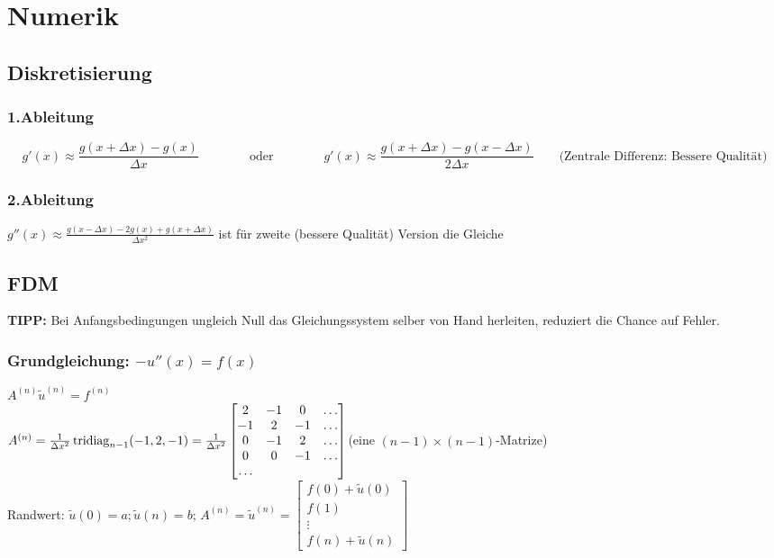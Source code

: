 
\section{Numerik}
\subsection{Diskretisierung}
\subsubsection{1.Ableitung}

$$g'(x)\approx \frac{g(x+\Delta x)-g(x)}{\Delta x} \qquad\qquad \text{oder}
\qquad\qquad \boxed{g'(x)\approx \frac{g(x+\Delta x)-g(x-\Delta x)}{2\Delta
x}}\qquad \text{(Zentrale Differenz: Bessere Qualität)}$$
\subsubsection{2.Ableitung}
$\boxed{g''(x)\approx \frac{g(x-\Delta x)-2 g(x) + g(x+ \Delta x)}{\Delta x^2}}$ ist für zweite (bessere Qualität) Version die Gleiche

\subsection{FDM}
\textbf{TIPP:} Bei Anfangsbedingungen ungleich Null das Gleichungssystem selber von Hand herleiten, reduziert die Chance auf Fehler.
\subsubsection{Grundgleichung: $-u''(x)=f(x)$}
$ A^{(n)} \tilde{u}^{(n)} =f^{(n)}   $\\
$A^{(n)}= \frac{1}{\Delta x^2} \operatorname{tridiag}_{n-1} (-1,2,-1) = \frac{1}{\Delta x^2}
  \begin{bmatrix}
             2& -1 & 0 & \ldots \\
             -1& 2 & -1 & \ldots \\
              0& -1 & 2 & \ldots \\
              0& 0 & -1 & \ldots \\
             \ldots 
           \end{bmatrix}$\qquad (eine $(n-1)\times(n-1)$-Matrize)\\ 
Randwert: $\tilde{u}(0)= a; \tilde{u}(n)=b $;
$A^{(n)}=\tilde{u}^{(n)} =\begin{bmatrix}
             f(0) + \tilde{u}(0) \\
             f(1) \\
             \vdots  \\
             f(n) + \tilde{u}(n)
           \end{bmatrix} $\\

